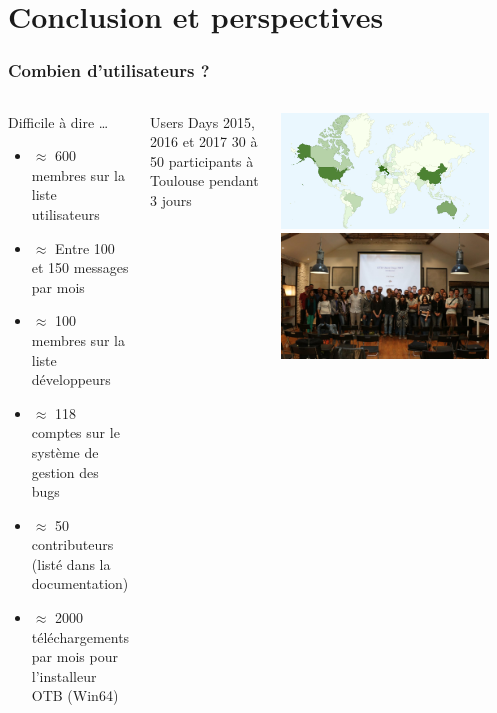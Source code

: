 \documentclass[8pt]{beamer}
\begin{document}
\section{Conclusion et perspectives}
\begin{frame}
\frametitle{Combien d'utilisateurs ?}
\begin{columns}[c]
\begin{block}{Difficile à dire \ldots}
\begin{itemize}
    \item $\approx$ 600 membres sur la liste utilisateurs
    \item $\approx$ Entre 100 et 150 messages par mois
    \item $\approx$ 100 membres sur la liste développeurs
    \item $\approx$ 118 comptes sur le système de gestion des bugs
    \item $\approx$ 50 contributeurs (listé dans la documentation)
    \item $\approx$ 2000 téléchargements par mois pour l'installeur OTB (Win64)
  \end{itemize}
\end{block}
\begin{block}{Users Days 2015, 2016 et 2017}
  30 à 50 participants à Toulouse pendant 3 jours
\end{block}
\includegraphics[width=0.9\textwidth]{images/OTB4_download_sourceforge_country_crop.png}\\
\includegraphics[width=0.9\textwidth]{images/userdays2017.jpg}
\end{columns}

\end{frame}
\end{document}
